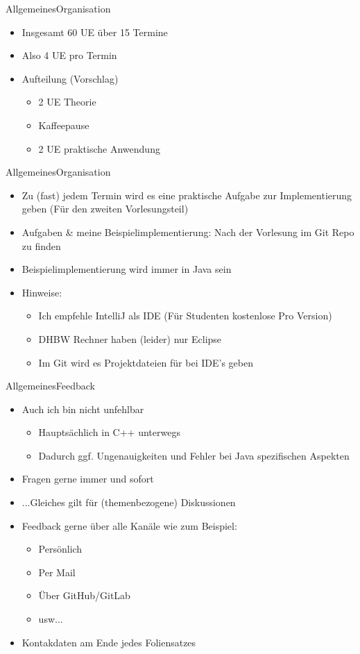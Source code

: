 \begin{frame}{Allgemeines}{Organisation}
	\begin{itemize}
		\item Insgesamt 60 UE über 15 Termine
		\item Also 4 UE pro Termin
		\item Aufteilung (Vorschlag)
		\begin{itemize}
			\item 2 UE Theorie
			\item Kaffeepause
			\item 2 UE praktische Anwendung
		\end{itemize}
	\end{itemize}
\end{frame}
\begin{frame}{Allgemeines}{Organisation}
	\begin{itemize}
		\item Zu (fast) jedem Termin wird es eine praktische Aufgabe zur Implementierung geben (Für den zweiten Vorlesungsteil)
		\item Aufgaben \& meine Beispielimplementierung: Nach der Vorlesung im Git Repo zu finden
		\item Beispielimplementierung wird immer in Java sein
		\item Hinweise:
		\begin{itemize}
			\item Ich empfehle IntelliJ als IDE (Für Studenten kostenlose Pro Version)
			\item DHBW Rechner haben (leider) nur Eclipse
			\item Im Git wird es Projektdateien für bei IDE's geben
		\end{itemize}
	\end{itemize}
\end{frame}

\begin{frame}{Allgemeines}{Feedback}
	\begin{itemize}
		\item Auch ich bin nicht unfehlbar
		\begin{itemize}
			\item Hauptsächlich in C++ unterwegs
			\item Dadurch ggf. Ungenauigkeiten und Fehler bei Java spezifischen Aspekten
		\end{itemize}
		\item Fragen gerne immer und sofort
		\item ...Gleiches gilt für (themenbezogene) Diskussionen
		\item Feedback gerne über alle Kanäle wie zum Beispiel:
		\begin{itemize}
			\item Persönlich
			\item Per Mail
			\item Über GitHub/GitLab
			\item usw...
		\end{itemize}
		\item Kontakdaten am Ende jedes Foliensatzes
	\end{itemize}
\end{frame}

